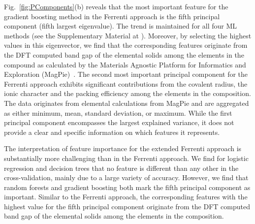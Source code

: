 \documentclass[superscriptaddress,unsortedaddress,
 amsmath,amssymb,
 aps,
]{revtex4-2}
\begin{document}
Fig.~\ref{fig:PComponents}(b) reveals that the most important feature for the gradient boosting method in the Ferrenti approach is the fifth principal component (fifth largest eigenvalue). The trend is maintained for all four ML methods (see the Supplementary Material at \cite{supplementary}). Moreover, by selecting the highest values in this eigenvector, we find that the corresponding features originate from the DFT computed band gap of the elemental solids among the elements in the compound as calculated by the Materials Agnostic Platform for Informatics and Exploration (MagPie)~\cite{magpie}. 
The second most important principal component for the Ferrenti approach exhibits significant contributions from the covalent radius, the ionic character and the packing efficiency among the elements in the composition. 
The data originates from elemental calculations from MagPie and are aggregated as either minimum, mean, standard deviation, or maximum. 
While the first principal component encompasses the largest explained variance, it does not provide a clear and specific information on which features it represents. 

The interpretation of feature importance for the extended Ferrenti approach is substantially more challenging than in the Ferrenti approach. We find for logistic regression and decision trees that no feature is different than any other in the cross-validation, mainly due to a large variety of accuracy. However, we find that random forests and gradient boosting both mark the fifth principal component as important. Similar to the Ferrenti approach, the corresponding features with the highest value for the fifth principal component originate from the DFT computed band gap of the elemental solids among the elements in the composition. 
\end{document}
